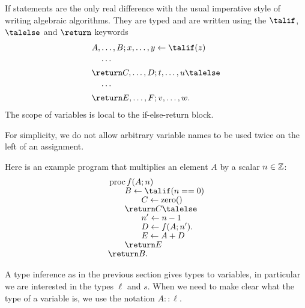 If statements are the only real difference with the usual imperative
style of writing algebraic algorithms. They are typed and are written
using the $\talif$, $\talelse$ and $\return$ keywords
\begin{equation}
  \label{eq:73}
  \begin{aligned}
    &A, \ldots, B;x,\ldots, y \la \talif (z)\\
    &\quad\cdots\\
    &\return C, \ldots, D;t,\ldots,u\talelse\\
    &\quad\cdots\\
    &\return E, \ldots, F;v,\ldots,w\text{.}
  \end{aligned}
\end{equation}
The scope of variables is local to the if-else-return block.

For simplicity, we do not allow arbitrary variable names to be used
twice on the left of an assignment.

Here is an example \tAL{} program that multiplies an element $A$ by a
scalar $n\in\mathbb{Z}$:
\begin{equation}
  \label{eq:tALprog}
  \begin{aligned}
    &\proc f(A; n)\\[-1ex]
    &\qquad B \la \talif (n == 0)\\[-1ex]
    &\qquad\qquad C \la \text{zero}()\\[-1ex]
    &\qquad \return C \talelse\\[-1ex]
    &\qquad\qquad n' \la n - 1\\[-1ex]
    &\qquad\qquad D \la f(A; n').\\[-1ex]
    &\qquad\qquad E \la A + D\\[-1ex]
    &\qquad \return E\\[-1ex]
    &\return B\text{.}
  \end{aligned}
\end{equation}

A type inference as in the previous section gives types to \tAL{}
variables, in particular we are interested in the types $\ell$ and
$s$. When we need to make clear what the type of a variable is, we use
the notation $A::\ell$.

